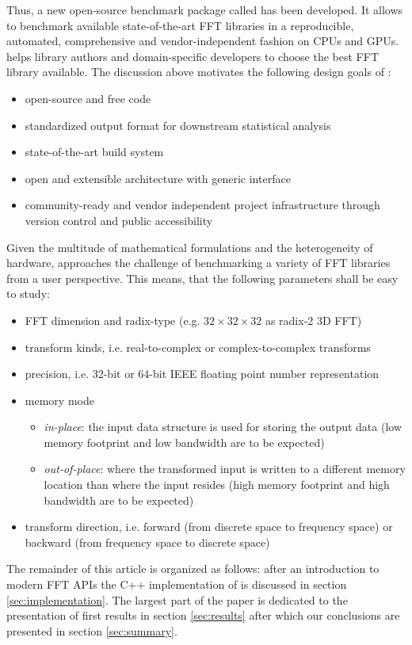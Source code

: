 Thus, a new open-source benchmark package called \gearshifft{} \citep{gearshifft_github} has been developed. It allows to benchmark available state-of-the-art FFT libraries in a reproducible, automated, comprehensive and vendor-independent fashion on CPUs and GPUs.
\gearshifft{} helps library authors and domain-specific developers to choose the best FFT library available. The discussion above motivates the following design goals of \gearshifft{}:
%
\begin{itemize}
\item open-source and free code
\item standardized output format for downstream statistical analysis
\item state-of-the-art build system
\item open and extensible architecture with generic interface
\item community-ready and vendor independent project infrastructure through version control and public accessibility
\end{itemize}
%
Given the multitude of mathematical formulations and the heterogeneity of hardware, \gearshifft{} approaches the challenge of benchmarking a variety of FFT libraries from a user perspective. This means, that the following parameters shall be easy to study:
%
\begin{itemize}
\item FFT dimension and radix-type (e.g. $32{\times}32{\times}32$ as radix-2 3D FFT)
\item transform kinds, i.e. real-to-complex or complex-to-complex transforms
\item precision, i.e. 32-bit or 64-bit IEEE floating point number representation
\item memory mode
  \begin{itemize}
  \item \emph{in-place}: the input data structure is used for storing the output data (low memory footprint and low bandwidth are to be expected)
  \item \emph{out-of-place}:  where the transformed input is written to a different memory location than where the input resides (high memory footprint and high bandwidth are to be expected)
  \end{itemize}
\item transform direction, i.e. forward (from discrete space to frequency space) or backward (from frequency space to discrete space)
\end{itemize}
%
The remainder of this article is organized as follows: after an introduction to modern FFT APIs the C++ implementation of \gearshifft{} is discussed in section \ref{sec:implementation}. The largest part of the paper is dedicated to the presentation of first results in section \ref{sec:results} after which our conclusions are presented in section \ref{sec:summary}.

